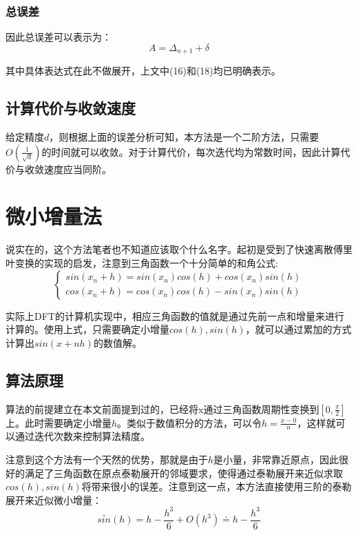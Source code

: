 \documentclass[UTF8]{ctexart}
\begin{document}
\subsubsection{总误差}

因此总误差可以表示为：
\begin{equation}
    A = \Delta_{n+1} + \delta
\end{equation}

其中具体表达式在此不做展开，上文中(16)和(18)均已明确表示。



\subsection{计算代价与收敛速度}
给定精度$d$，则根据上面的误差分析可知，本方法是一个二阶方法，只需要$O(\frac{1}{\sqrt{d}})$的时间就可以收敛。对于计算代价，每次迭代均为常数时间，因此计算代价与收敛速度应当同阶。

\section{微小增量法}

说实在的，这个方法笔者也不知道应该取个什么名字。起初是受到了快速离散傅里叶变换的实现的启发，注意到三角函数一个十分简单的和角公式:
\begin{equation}
    \begin{cases}
        sin(x_n+h) = sin(x_n){cos}(h)+cos(x_n){sin}(h)\\
        cos(x_n+h) = cos(x_n){cos}(h) - sin(x_n){sin}(h)
    \end{cases}
\end{equation}

实际上DFT的计算机实现中，相应三角函数的值就是通过先前一点和增量来进行计算的。使用上式，只需要确定小增量$cos(h),sin(h)$，就可以通过累加的方式计算出$sin(x+nh)$的数值解。

\subsection{算法原理}

算法的前提建立在本文前面提到过的，已经将x通过三角函数周期性变换到$[0,\frac{\pi}{2}]$上。此时需要确定小增量$h$。类似于数值积分的方法，可以令$h=\frac{x-0}{n}$，这样就可以通过迭代次数来控制算法精度。

注意到这个方法有一个天然的优势，那就是由于$h$是小量，非常靠近原点，因此很好的满足了三角函数在原点泰勒展开的邻域要求，使得通过泰勒展开来近似求取$cos(h),sin(h)$将带来很小的误差。注意到这一点，本方法直接使用三阶的泰勒展开来近似微小增量：
\begin{equation}
    \bar{sin}(h) = h - \frac{h^3}{6} + O(h^3) \doteq  h - \frac{h^3}{6}
\end{equation}
\end{document}
